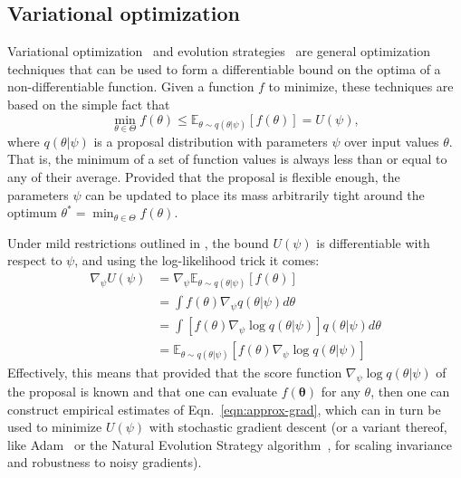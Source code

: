 \documentclass[twocolumn,superscriptaddress,aps]{revtex4-1}
\theoremstyle{plain}
\begin{document}
\subsection{Variational optimization}

Variational optimization~\cite{2012arXiv1212.4507S} and evolution strategies~\citep{2011arXiv1106.4487W} are general
optimization techniques that can be used to form a differentiable bound
on the optima of a non-differentiable function. Given a function $f$ to minimize,
these techniques are based on the simple fact that
\begin{equation}
    \min_{\theta \in \Theta} f(\theta) \leq \mathbb{E}_{\theta \sim q(\theta|\psi)} [f(\theta)] = U(\psi),
\end{equation}
where $q(\theta|\psi)$ is a proposal distribution with parameters $\psi$ over input values $\theta$.
That is, the minimum of a set of function values is always less than or equal
to any of their average. Provided that the proposal is flexible enough, the parameters $\psi$
can be updated to place its mass arbitrarily tight around the optimum $\theta^* = \min_{\theta \in \Theta} f(\theta)$.

Under mild restrictions outlined in  \citep{2012arXiv1212.4507S}, the bound
$U(\psi)$ is differentiable with respect to $\psi$, and using the log-likelihood
trick it comes:
\begin{align}\label{eqn:approx-grad}
    \nabla_\psi U(\psi) &= \nabla_\psi \mathbb{E}_{\theta \sim q(\theta|\psi)} [f(\theta)] \nonumber \\
    &= \int f(\theta) \nabla_\psi q(\theta|\psi)  d\theta \nonumber \\
    &= \int \left[ f(\theta) \nabla_\psi \log q(\theta|\psi) \right]  q(\theta|\psi) d\theta \nonumber \\
    &= \mathbb{E}_{\theta \sim q(\theta|\psi)} [f(\theta) \nabla_\psi \log q(\theta|\psi)]
\end{align}
Effectively, this means that provided that the score function $\nabla_\psi \log
q(\theta|\psi)$ of the proposal is known and that one can evaluate
$f(\mathbf{\theta})$ for any $\theta$, then one can construct empirical
estimates of Eqn.~\ref{eqn:approx-grad}, which can in turn be used to minimize
$U(\psi)$ with stochastic gradient descent (or a variant thereof, like
Adam~\cite{2014arXiv1412.6980K} or the Natural Evolution Strategy
algorithm~\citep{2011arXiv1106.4487W}, for scaling invariance and
robustness to noisy gradients).
\end{document}
